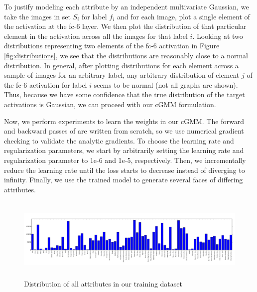 \documentclass[10pt,twocolumn,letterpaper]{article}
\begin{document}
To justify modeling each attribute by an independent multivariate Gaussian, we take the images in set $S_i$ for label $f_i$ and for each image, plot a single element of the activation at the fc-6 layer. We then plot the distribution of that particular element in the activation across all the images for that label $i$. Looking at two distributions representing two elements of the fc-6 activation in Figure \ref{fig:distributions}, we see that the distributions are reasonably close to a normal distribution. In general, after plotting distributions for each element across a sample of images for an arbitrary label, any arbitrary distribution of element $j$ of the fc-6 activation for label $i$ seems to be normal (not all graphs are shown). Thus, because we have some confidence that the true distribution of the target activations is Gaussian, we can proceed with our cGMM formulation. 

Now, we perform experiments to learn the weights in our cGMM. The forward and backward passes of are written from scratch, so we use numerical gradient checking to validate the analytic gradients. To choose the learning rate and regularization parameters, we start by arbitrarily setting the learning rate and regularization parameter to 1e-6 and 1e-5, respectively. Then, we incrementally reduce the learning rate until the loss starts to decrease instead of diverging to infinity. Finally, we use the trained model to generate several faces of differing attributes. 

\begin{figure}
  \includegraphics[width=\textwidth,height=4cm]{images/analysis/class_distribution_landscape.png}
  \caption{Distribution of all attributes in our training dataset}
  \label{fig:attrib-distrib}
\end{figure}
\end{document}
